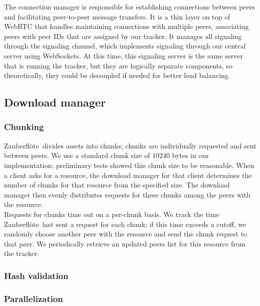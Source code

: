\documentclass[letterpaper,twocolumn,10pt]{article}
\newcommand{\zbf}{Zauberfl\"{o}te}
\begin{document}
The connection manager is responsible for establishing connections between
peers and facilitating peer-to-peer message transfers. It is a thin layer on
top of WebRTC that handles maintaining connections with multiple peers,
associating peers with peer IDs that are assigned by our tracker. It manages
all signaling through the signaling channel, which implements signaling through
our central server using WebSockets. At this time, this signaling server is the
same server that is running the tracker, but they are logically separate
components, so theoretically, they could be decoupled if needed for better load
balancing.

\subsection{Download manager}


\subsubsection{Chunking}

\zbf\ divides assets into chunks; chunks are individually requested and sent between peers. We use a standard chunk size of 10240 bytes in our implementation; preliminary tests showed this chunk size to be reasonable. When a client asks for a resource, the download manager for that client determines the number of chunks for that resource from the specified size. The download manager then evenly distributes requests for these chunks among the peers with the resource. \\
Requests for chunks time out on a per-chunk basis. We track the time \zbf\ last sent a request for each chunk; if this time exceeds a cutoff, we randomly choose another peer with the resource and send the chunk request to that peer. We periodically retrieve an updated peers list for this resource from the tracker. 

\subsubsection{Hash validation}


\subsubsection{Parallelization}

\end{document}
